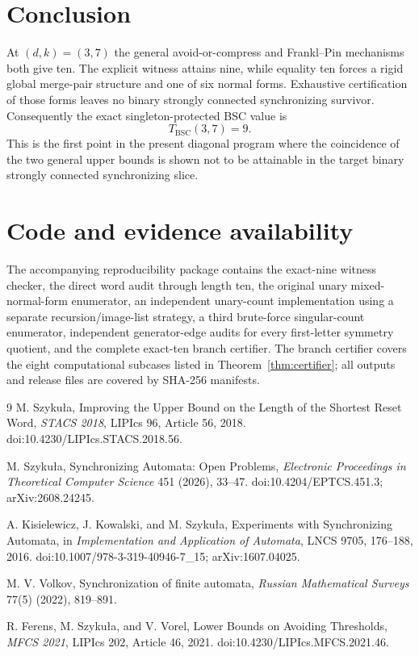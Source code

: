 \documentclass[11pt]{article}
\theoremstyle{definition}
\theoremstyle{remark}
\newcommand{\BSC}{\mathrm{BSC}}
\begin{document}
\section{Conclusion}
At $(d,k)=(3,7)$ the general avoid-or-compress and Frankl--Pin mechanisms both give ten. The explicit witness attains nine, while equality ten forces a rigid global merge-pair structure and one of six normal forms. Exhaustive certification of those forms leaves no binary strongly connected synchronizing survivor. Consequently the exact singleton-protected BSC value is
\[
T_{\BSC}(3,7)=9.
\]
This is the first point in the present diagonal program where the coincidence of the two general upper bounds is shown not to be attainable in the target binary strongly connected synchronizing slice.

\section*{Code and evidence availability}
The accompanying reproducibility package contains the exact-nine witness checker, the direct word audit through length ten, the original unary mixed-normal-form enumerator, an independent unary-count implementation using a separate recursion/image-list strategy, a third brute-force singular-count enumerator, independent generator-edge audits for every first-letter symmetry quotient, and the complete exact-ten branch certifier. The branch certifier covers the eight computational subcases listed in Theorem~\ref{thm:certifier}; all outputs and release files are covered by SHA-256 manifests.

\begin{thebibliography}{9}
M. Szyku\l a,
\newblock Improving the Upper Bound on the Length of the Shortest Reset Word,
\newblock \emph{STACS 2018}, LIPIcs 96, Article 56, 2018.
\newblock doi:10.4230/LIPIcs.STACS.2018.56.

M. Szyku\l a,
\newblock Synchronizing Automata: Open Problems,
\newblock \emph{Electronic Proceedings in Theoretical Computer Science} 451 (2026), 33--47.
\newblock doi:10.4204/EPTCS.451.3; arXiv:2608.24245.

A. Kisielewicz, J. Kowalski, and M. Szyku\l a,
\newblock Experiments with Synchronizing Automata,
\newblock in \emph{Implementation and Application of Automata}, LNCS 9705, 176--188, 2016.
\newblock doi:10.1007/978-3-319-40946-7\_15; arXiv:1607.04025.

M. V. Volkov,
\newblock Synchronization of finite automata,
\newblock \emph{Russian Mathematical Surveys} 77(5) (2022), 819--891.

R. Ferens, M. Szyku\l a, and V. Vorel,
\newblock Lower Bounds on Avoiding Thresholds,
\newblock \emph{MFCS 2021}, LIPIcs 202, Article 46, 2021.
\newblock doi:10.4230/LIPIcs.MFCS.2021.46.
\end{thebibliography}
\end{document}
